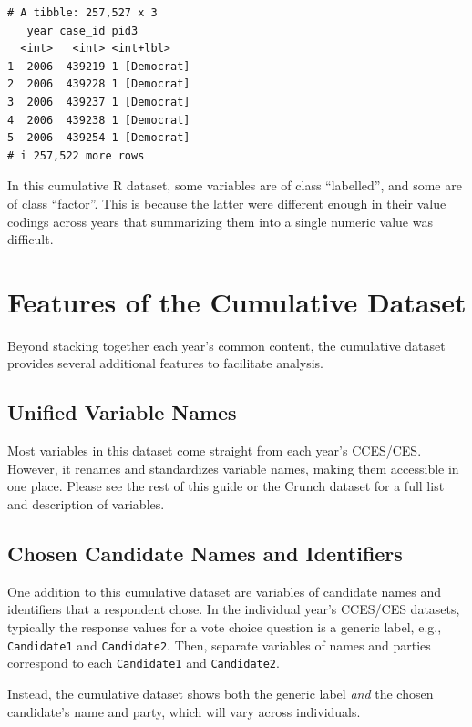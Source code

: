 \documentclass[10pt,article,oneside]{memoir}
\begin{document}
\begin{verbatim}
# A tibble: 257,527 x 3
   year case_id pid3        
  <int>   <int> <int+lbl>   
1  2006  439219 1 [Democrat]
2  2006  439228 1 [Democrat]
3  2006  439237 1 [Democrat]
4  2006  439238 1 [Democrat]
5  2006  439254 1 [Democrat]
# i 257,522 more rows
\end{verbatim}

\indent In this cumulative R dataset, some variables are of class
``labelled'', and some are of class ``factor''. This is because the
latter were different enough in their value codings across years that
summarizing them into a single numeric value was difficult.

\newpage

\section{Features of the Cumulative
Dataset}\label{features-of-the-cumulative-dataset}

Beyond stacking together each year's common content, the cumulative
dataset provides several additional features to facilitate analysis.

\subsection{Unified Variable Names}\label{unified-variable-names}

Most variables in this dataset come straight from each year's CCES/CES.
However, it renames and standardizes variable names, making them
accessible in one place. Please see the rest of this guide or the Crunch
dataset for a full list and description of variables.

\subsection{Chosen Candidate Names and
Identifiers}\label{chosen-candidate-names-and-identifiers}

One addition to this cumulative dataset are variables of candidate names
and identifiers that a respondent chose. In the individual year's
CCES/CES datasets, typically the response values for a vote choice
question is a generic label, e.g., \texttt{Candidate1} and
\texttt{Candidate2}. Then, separate variables of names and parties
correspond to each \texttt{Candidate1} and \texttt{Candidate2}.

Instead, the cumulative dataset shows both the generic label \emph{and}
the chosen candidate's name and party, which will vary across
individuals.
\end{document}
